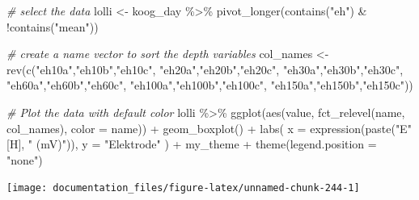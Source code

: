 \documentclass[
]{article}
\newenvironment{Shaded}{\begin{snugshade}}{\end{snugshade}}
\newcommand{\AttributeTok}[1]{\textcolor[rgb]{0.77,0.63,0.00}{#1}}
\newcommand{\CommentTok}[1]{\textcolor[rgb]{0.56,0.35,0.01}{\textit{#1}}}
\newcommand{\FunctionTok}[1]{\textcolor[rgb]{0.00,0.00,0.00}{#1}}
\newcommand{\NormalTok}[1]{#1}
\newcommand{\OtherTok}[1]{\textcolor[rgb]{0.56,0.35,0.01}{#1}}
\newcommand{\SpecialCharTok}[1]{\textcolor[rgb]{0.00,0.00,0.00}{#1}}
\newcommand{\StringTok}[1]{\textcolor[rgb]{0.31,0.60,0.02}{#1}}
\begin{document}
\begin{Shaded}
\begin{Highlighting}[]
\CommentTok{\# select the data}
\NormalTok{lolli }\OtherTok{\textless{}{-}}\NormalTok{ koog\_day }\SpecialCharTok{\%\textgreater{}\%}
  \FunctionTok{pivot\_longer}\NormalTok{(}\FunctionTok{contains}\NormalTok{(}\StringTok{"eh"}\NormalTok{) }\SpecialCharTok{\&} \SpecialCharTok{!}\FunctionTok{contains}\NormalTok{(}\StringTok{"mean"}\NormalTok{))}

\CommentTok{\# create a name vector to sort the depth variables}
\NormalTok{col\_names }\OtherTok{\textless{}{-}} \FunctionTok{rev}\NormalTok{(}\FunctionTok{c}\NormalTok{(}\StringTok{"eh10a"}\NormalTok{,}\StringTok{"eh10b"}\NormalTok{,}\StringTok{"eh10c"}\NormalTok{,}
                   \StringTok{"eh20a"}\NormalTok{,}\StringTok{"eh20b"}\NormalTok{,}\StringTok{"eh20c"}\NormalTok{,}
                   \StringTok{"eh30a"}\NormalTok{,}\StringTok{"eh30b"}\NormalTok{,}\StringTok{"eh30c"}\NormalTok{,}
                                           \StringTok{"eh60a"}\NormalTok{,}\StringTok{"eh60b"}\NormalTok{,}\StringTok{"eh60c"}\NormalTok{,}
                                           \StringTok{"eh100a"}\NormalTok{,}\StringTok{"eh100b"}\NormalTok{,}\StringTok{"eh100c"}\NormalTok{,}
                                           \StringTok{"eh150a"}\NormalTok{,}\StringTok{"eh150b"}\NormalTok{,}\StringTok{"eh150c"}\NormalTok{))}
  
\CommentTok{\# Plot the data with default color}
\NormalTok{lolli }\SpecialCharTok{\%\textgreater{}\%}
  \FunctionTok{ggplot}\NormalTok{(}\FunctionTok{aes}\NormalTok{(value, }\FunctionTok{fct\_relevel}\NormalTok{(name, col\_names), }\AttributeTok{color =}\NormalTok{ name)) }\SpecialCharTok{+} 
  \FunctionTok{geom\_boxplot}\NormalTok{() }\SpecialCharTok{+}
  \FunctionTok{labs}\NormalTok{(}
    \AttributeTok{x =} \FunctionTok{expression}\NormalTok{(}\FunctionTok{paste}\NormalTok{(}\StringTok{"E"}\NormalTok{ [H], }\StringTok{" (mV)"}\NormalTok{)),}
    \AttributeTok{y =} \StringTok{"Elektrode"}
\NormalTok{  ) }\SpecialCharTok{+}
\NormalTok{  my\_theme }\SpecialCharTok{+}
  \FunctionTok{theme}\NormalTok{(}\AttributeTok{legend.position =} \StringTok{"none"}\NormalTok{)}
\end{Highlighting}
\end{Shaded}

\begin{center}\texttt{[image: documentation\_files/figure-latex/unnamed-chunk-244-1]} \end{center}
\end{document}
